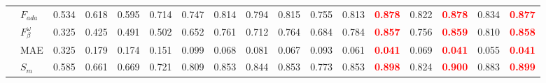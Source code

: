 \documentclass[runningheads]{llncs}
\begin{document}
\begin{table}[t]
{\begin{tabular}{@{}rl|ccccccccccc|cc|cc@{}}
    & $F_{ada}$            & 0.534                                     & 0.618                                       & 0.595                                       & 0.714                                  & 0.747                                      & 0.814                                          & 0.794                                      & 0.815                                        & 0.755                                            & 0.813                                      & \textcolor{red}{\textbf{0.878}} & 0.822                                          & \textcolor{red}{\textbf{0.878}} & 0.834                                     & \textcolor{red}{\textbf{0.877}} \\
    & $F_{\beta}^{\omega}$ & 0.325                                     & 0.425                                       & 0.491                                       & 0.502                                  & 0.652                                      & 0.761                                          & 0.712                                      & 0.764                                        & 0.684                                            & 0.784                                      & \textcolor{red}{\textbf{0.857}} & 0.756                                          & \textcolor{red}{\textbf{0.859}} & 0.810                                     & \textcolor{red}{\textbf{0.858}} \\
    & MAE                  & 0.325                                     & 0.179                                       & 0.174                                       & 0.151                                  & 0.099                                      & 0.068                                          & 0.081                                      & 0.067                                        & 0.093                                            & 0.061                                      & \textcolor{red}{\textbf{0.041}} & 0.069                                          & \textcolor{red}{\textbf{0.041}} & 0.055                                     & \textcolor{red}{\textbf{0.041}} \\
    & $S_{m}$              & 0.585                                     & 0.661                                       & 0.669                                       & 0.721                                  & 0.809                                      & 0.853                                          & 0.844                                      & 0.853                                        & 0.773                                            & 0.853                                      & \textcolor{red}{\textbf{0.898}} & 0.824                                          & \textcolor{red}{\textbf{0.900}} & 0.883                                     & \textcolor{red}{\textbf{0.899}} \\

\end{tabular}}
\end{table}
\end{document}

